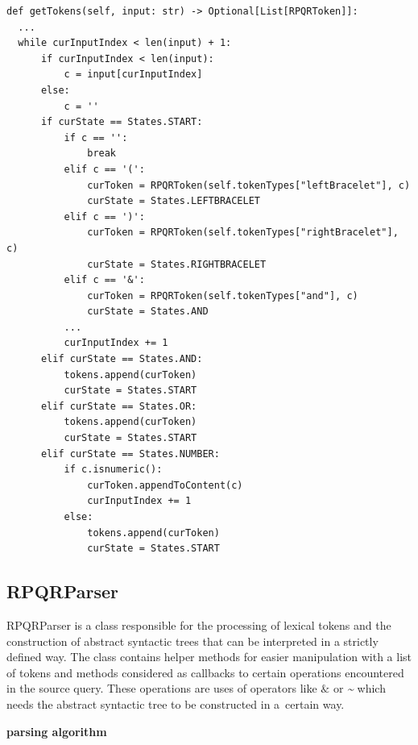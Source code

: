 \begin{lstlisting}
def getTokens(self, input: str) -> Optional[List[RPQRToken]]:
  ...
  while curInputIndex < len(input) + 1:
      if curInputIndex < len(input):
          c = input[curInputIndex]
      else:
          c = ''
      if curState == States.START:
          if c == '':
              break
          elif c == '(':
              curToken = RPQRToken(self.tokenTypes["leftBracelet"], c)
              curState = States.LEFTBRACELET
          elif c == ')':
              curToken = RPQRToken(self.tokenTypes["rightBracelet"], c)
              curState = States.RIGHTBRACELET
          elif c == '&':
              curToken = RPQRToken(self.tokenTypes["and"], c)
              curState = States.AND
          ...
          curInputIndex += 1
      elif curState == States.AND:
          tokens.append(curToken)
          curState = States.START
      elif curState == States.OR:
          tokens.append(curToken)
          curState = States.START
      elif curState == States.NUMBER:
          if c.isnumeric():
              curToken.appendToContent(c)
              curInputIndex += 1
          else:
              tokens.append(curToken)
              curState = States.START
\end{lstlisting}

\subsection*{RPQRParser}

RPQRParser is a class responsible for the processing of lexical tokens and the construction of abstract syntactic
trees that can be interpreted in a strictly defined way. The class contains helper methods for easier
manipulation with a list of tokens and methods considered as callbacks to certain operations encountered
in the source query. These operations are uses of operators like \textit{$\&$} or \textit{\textasciitilde}
which needs the abstract syntactic tree to be constructed in a~certain way.

\textbf{parsing algorithm}

